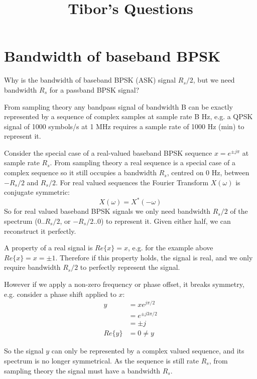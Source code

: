 \documentclass{article}
\begin{document}
\title{Tibor's Questions}
\maketitle

\section{Bandwidth of baseband BPSK}

Why is the bandwidth of baseband BPSK (ASK) signal $R_s/2$, but we need bandwidth $R_s$ for a passband BPSK signal?

From sampling theory any bandpass signal of bandwidth B can be exactly represented by a sequence of complex samples at sample rate B Hz, e.g. a QPSK signal of 1000 symbols/s at 1 MHz requires a sample rate of 1000 Hz (min) to represent it.

Consider the special case of a real-valued baseband BPSK sequence $x = e^{\pm j \pi}$ at sample rate $R_s$.  From sampling theory a real sequence is a special case of a complex sequence so it still occupies a bandwidth $R_s$, centred on 0 Hz, between $-R_s/2$ and $R_s/2$. For real valued sequences the Fourier Transform $X(\omega)$ is conjugate symmetric:
\begin{equation}
X(\omega) = X^*(-\omega)
\end{equation}
So for real valued baseband BPSK signals we only need bandwidth $R_s/2$ of the spectrum ($0..R_s/2$, or $-R_s/2..0$) to represent it.  Given either half, we can reconstruct it perfectly.

A property of a real signal is $Re\{x\} = x$, e.g. for the example above $Re\{x\} = x = \pm 1$. Therefore if this property holds, the signal is real, and we only require bandwidth $R_s/2$ to perfectly represent the signal.
            
However if we apply a non-zero frequency or phase offset, it breaks symmetry, e.g. consider a phase shift applied to $x$:
\begin{equation}
\begin{split}
y &= x e^{j \pi/2} \\
  &= e^{\pm j3 \pi /2} \\
  &= \pm j \\
Re\{y\} &= 0 \ne y
\end{split}
\end{equation}

So the signal $y$ can only be represented by a complex valued sequence, and its spectrum is no longer symmetrical.  As the sequence is still rate $R_s$, from sampling theory the signal must have a bandwidth $R_s$.
\end{document}

